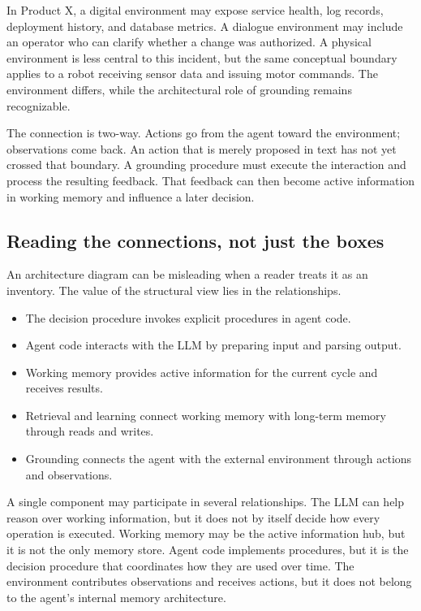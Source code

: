 In Product X, a digital environment may expose service health, log records, deployment history, and database metrics. A dialogue environment may include an operator who can clarify whether a change was authorized. A physical environment is less central to this incident, but the same conceptual boundary applies to a robot receiving sensor data and issuing motor commands. The environment differs, while the architectural role of grounding remains recognizable.

The connection is two-way. Actions go from the agent toward the environment; observations come back. An action that is merely proposed in text has not yet crossed that boundary. A grounding procedure must execute the interaction and process the resulting feedback. That feedback can then become active information in working memory and influence a later decision.

\subsection{Reading the connections, not just the boxes}

An architecture diagram can be misleading when a reader treats it as an inventory. The value of the structural view lies in the relationships.

\begin{itemize}
  \item The decision procedure invokes explicit procedures in agent code.
  \item Agent code interacts with the LLM by preparing input and parsing output.
  \item Working memory provides active information for the current cycle and receives results.
  \item Retrieval and learning connect working memory with long-term memory through reads and writes.
  \item Grounding connects the agent with the external environment through actions and observations.
\end{itemize}

A single component may participate in several relationships. The LLM can help reason over working information, but it does not by itself decide how every operation is executed. Working memory may be the active information hub, but it is not the only memory store. Agent code implements procedures, but it is the decision procedure that coordinates how they are used over time. The environment contributes observations and receives actions, but it does not belong to the agent's internal memory architecture.

